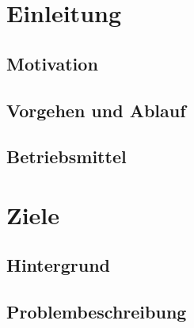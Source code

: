 \documentclass[toc=bib,toc=listof, 12pt]{scrreprt}
\begin{document}

\maketitle
\pagestyle{empty}

\newpage

\newpage
\tableofcontents
\newpage
\clearpage
\thispagestyle{empty}


\newpage
%
\pagestyle{scrheadings}
\chapter{Einleitung} %
\setcounter{page}{1}
\label{sec:einleitung}
	\section{Motivation} %
	\label{sec:motivation}
		
	\pagebreak
	\section{Vorgehen und Ablauf} %
	\label{sec:vorgehen_und_ablauf}
					
	\section{Betriebsmittel} 
	\label{sec:betriebsmittel}
		
\newpage
\clearpage
\thispagestyle{empty}

\chapter{Ziele}
\setcounter{page}{4}
\label{sec:ziele}	
	\section{Hintergrund}
	\label{sec:hintergrund}
		
		\pagebreak
	\section{Problembeschreibung}
		
\end{document}
